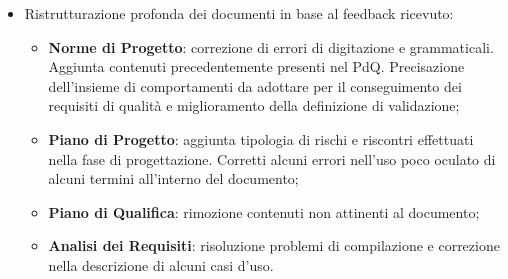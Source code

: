 \documentclass[openany,12pt,a4paper]{report}
\begin{document}
\begin{itemize}
	\item Ristrutturazione profonda dei documenti in base al feedback ricevuto:
	\begin{itemize}
		\item \textbf{Norme di Progetto}: correzione di errori di digitazione e grammaticali. Aggiunta contenuti precedentemente presenti nel PdQ. Precisazione dell'insieme di comportamenti da adottare per il conseguimento dei requisiti di qualità e miglioramento della definizione di validazione;
		\item \textbf{Piano di Progetto}: aggiunta tipologia di rischi e riscontri effettuati nella fase di progettazione. Corretti alcuni errori nell'uso poco oculato di alcuni termini all'interno del documento;
		\item \textbf{Piano di Qualifica}: rimozione contenuti non attinenti al documento;
		\item \textbf{Analisi dei Requisiti}: risoluzione problemi di compilazione e correzione nella descrizione di alcuni casi d'uso.
	\end{itemize}
\end{itemize}
\end{document}
